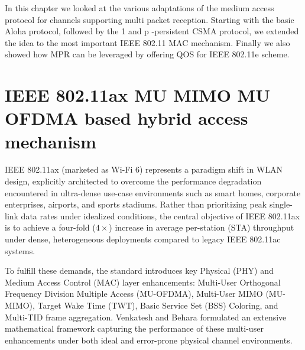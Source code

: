 In this chapter we looked at the various adaptations of the medium access protocol for channels supporting multi packet reception. Starting with the basic Aloha protocol, followed by the 1 and p -persistent CSMA protocol, we extended the idea to the most important IEEE 802.11 MAC mechanism. Finally we also showed how MPR can be leveraged by offering QOS for IEEE 802.11e scheme.

\chapter{IEEE 802.11ax MU MIMO MU OFDMA based hybrid access mechanism}
IEEE 802.11ax (marketed as Wi-Fi 6) represents a paradigm shift in WLAN design, explicitly architected to overcome the performance degradation encountered in ultra-dense use-case environments such as smart homes, corporate enterprises, airports, and sports stadiums. Rather than prioritizing peak single-link data rates under idealized conditions, the central objective of IEEE 802.11ax is to achieve a four-fold ($4\times$) increase in average per-station (STA) throughput under dense, heterogeneous deployments compared to legacy IEEE 802.11ac systems.

To fulfill these demands, the standard introduces key Physical (PHY) and Medium Access Control (MAC) layer enhancements: Multi-User Orthogonal Frequency Division Multiple Access (MU-OFDMA), Multi-User MIMO (MU-MIMO), Target Wake Time (TWT), Basic Service Set (BSS) Coloring, and Multi-TID frame aggregation. Venkatesh and Behara \cite{behara2022fluid, behara2023performance} formulated an extensive mathematical framework capturing the performance of these multi-user enhancements under both ideal and error-prone physical channel environments.

